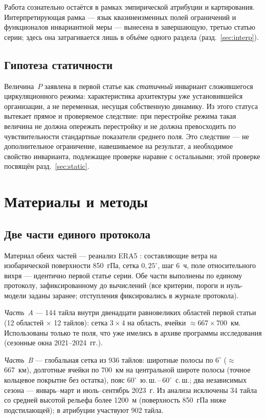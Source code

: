 \documentclass[11pt,a4paper]{article}
\begin{document}
Работа сознательно остаётся в рамках эмпирической атрибуции и картирования. Интерпретирующая рамка --- язык квазинеизменных полей ограничений и функционалов инвариантной меры --- вынесена в завершающую, третью статью серии; здесь она затрагивается лишь в объёме одного раздела (разд.~\ref{sec:interp}).

\subsection{Гипотеза статичности}

Величина~$P$ заявлена в первой статье как \emph{статичный} инвариант сложившегося циркуляционного режима: характеристика архитектуры уже установившейся организации, а не переменная, несущая собственную динамику. Из этого статуса вытекает прямое и проверяемое следствие: при перестройке режима такая величина не должна опережать перестройку и не должна превосходить по чувствительности стандартные показатели среднего поля. Это следствие --- не дополнительное ограничение, навешиваемое на результат, а необходимое свойство инварианта, подлежащее проверке наравне с остальными; этой проверке посвящён разд.~\ref{sec:static}.

\section{Материалы и методы}
\label{sec:data}

\subsection{Две части единого протокола}

Материал обеих частей --- реанализ ERA5 \cite{Hersbach2020,Soci2024}: составляющие ветра на изобарической поверхности 850~гПа, сетка $0{,}25^\circ$, шаг 6~ч, поле относительного вихря --- идентично первой статье серии. Обе части выполнены по единому протоколу, зафиксированному до вычислений (все критерии, пороги и нуль-модели заданы заранее; отступления фиксировались в журнале протокола).

\emph{Часть~A} --- 144 тайла внутри двенадцати равновеликих областей первой статьи (12 областей $\times$ 12 тайлов): сетка $3\times4$ на область, ячейки $\approx667\times700$~км. Использованы только те поля, что уже имелись в архиве программы исследования (сезонные окна 2021--2024~гг.).

\emph{Часть~B} --- глобальная сетка из 936 тайлов: широтные полосы по $6^\circ$ ($\approx$667~км), долготные ячейки по 700~км на центральной широте полосы (точное кольцевое покрытие без остатка), пояс $60^\circ$~ю.\,ш.\,--\,$60^\circ$~с.\,ш.; два независимых сезона --- январь--март и июль--сентябрь 2023~г. Из анализа исключены 34 тайла со средней высотой рельефа более 1200~м (поверхность 850~гПа ниже подстилающей); в атрибуции участвуют 902 тайла.
\end{document}
